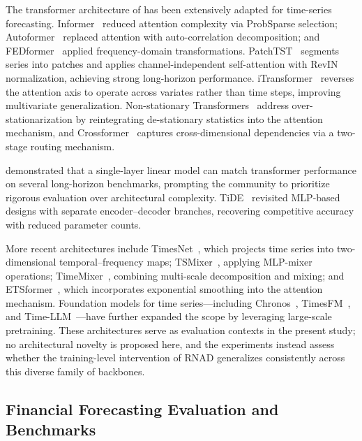 \documentclass[11pt]{article}
\newcommand{\RNAD}{RNAD\xspace}
\begin{document}
The transformer architecture of \citet{vaswani2017attention} has been
extensively adapted for time-series forecasting.
Informer~\citep{zhou2021informer} reduced attention complexity via
ProbSparse selection; Autoformer~\citep{wu2021autoformer} replaced
attention with auto-correlation decomposition; and
FEDformer~\citep{zhou2022fedformer} applied frequency-domain
transformations. PatchTST~\citep{patchtst} segments series into
patches and applies channel-independent self-attention with RevIN
normalization, achieving strong long-horizon performance.
iTransformer~\citep{itransformer} reverses the attention axis to
operate across variates rather than time steps, improving multivariate
generalization. Non-stationary Transformers~\citep{liu2022non} address
over-stationarization by reintegrating de-stationary statistics into
the attention mechanism, and Crossformer~\citep{zhang2023crossformer}
captures cross-dimensional dependencies via a two-stage routing
mechanism.

\citet{zeng2023dlinear} demonstrated that a single-layer linear model
can match transformer performance on several long-horizon benchmarks,
prompting the community to prioritize rigorous evaluation over
architectural complexity. TiDE~\citep{das2023long} revisited
MLP-based designs with separate encoder--decoder branches, recovering
competitive accuracy with reduced parameter counts.

More recent architectures include TimesNet~\citep{wu2023timesnet},
which projects time series into two-dimensional temporal--frequency
maps; TSMixer~\citep{ekambaram2023tsmixer}, applying MLP-mixer
operations; TimeMixer~\citep{wang2024timemixer}, combining multi-scale
decomposition and mixing; and ETSformer~\citep{woo2022etsformer},
which incorporates exponential smoothing into the attention mechanism.
Foundation models for time series---including
Chronos~\citep{ansari2024chronos}, TimesFM~\citep{das2024decoder},
and Time-LLM~\citep{jin2023time}---have further expanded the scope
by leveraging large-scale pretraining. These architectures serve as
evaluation contexts in the present study; no architectural novelty
is proposed here, and the experiments instead assess whether the
training-level intervention of \RNAD generalizes consistently across
this diverse family of backbones.

\subsection{Financial Forecasting Evaluation and Benchmarks}
\end{document}
